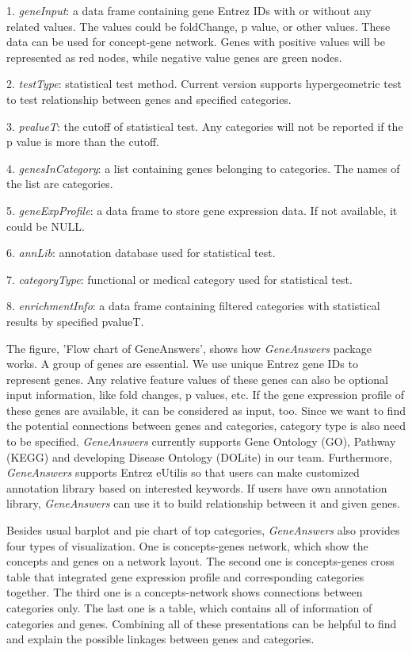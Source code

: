 \documentclass[a4paper]{article}
\newcommand{\Rpackage}[1]{{\textit{#1}}}
\begin{document}
1. {\it geneInput}: a data frame containing gene Entrez IDs with or without any related values. The values could be foldChange, p value, or other values. These data can be used for concept-gene network. Genes with positive values will be represented as red nodes, while negative value genes are green nodes.

2. {\it testType}: statistical test method. Current version supports hypergeometric test to test relationship between genes and specified categories.

3. {\it pvalueT}: the cutoff of statistical test. Any categories will not be reported if the p value is more than the cutoff.

4. {\it genesInCategory}: a list containing genes belonging to categories. The names of the list are categories.

5. {\it geneExpProfile}: a data frame to store gene expression data. If not available, it could be NULL.

6. {\it annLib}: annotation database used for statistical test.

7. {\it categoryType}: functional or medical category used for statistical test.

8. {\it enrichmentInfo}: a data frame containing filtered categories with statistical results by specified pvalueT.

The figure, 'Flow chart of GeneAnswers', shows how \Rpackage{GeneAnswers} package works. A group of genes are essential. We use unique Entrez gene IDs to represent genes. Any relative feature values of these genes can also be optional input information, like fold changes, p values, etc. If the gene expression profile of these genes are available, it can be considered as input, too. Since we want to find the potential connections between genes and categories, category type is also need to be specified. \Rpackage{GeneAnswers} currently supports Gene Ontology (GO), Pathway (KEGG) and developing Disease Ontology (DOLite) in our team. Furthermore, \Rpackage{GeneAnswers} supports Entrez eUtilis so that users can make customized annotation library based on interested keywords. If users have own annotation library, \Rpackage{GeneAnswers} can use it to build relationship between it and given genes.

Besides usual barplot and pie chart of top categories, \Rpackage{GeneAnswers} also provides four types of visualization. One is concepts-genes network, which show the concepts and genes on a network layout. The second one is concepts-genes cross table that integrated gene expression profile and corresponding categories together. The third one is a concepts-network shows connections between categories only. The last one is a table, which contains all of information of categories and genes. Combining all of these presentations can be helpful to find and explain the possible linkages between genes and categories.
\end{document}
